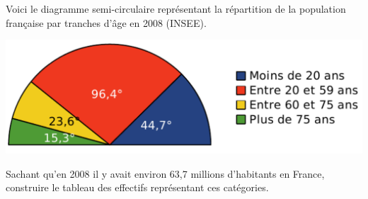 

\begin{rituel}
 Voici le diagramme semi-circulaire représentant la répartition de la population française par tranches d'âge en 2008 (INSEE).


\includegraphics[width=0.8\linewidth]{diagsspop.pdf}


Sachant qu'en 2008 il y avait environ 63,7 millions d'habitants en France, construire le tableau des effectifs représentant ces catégories. 

\end{rituel}
